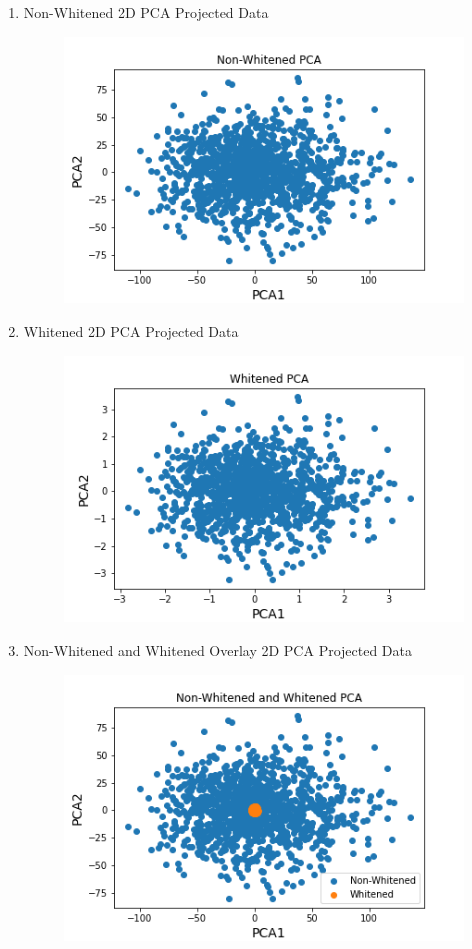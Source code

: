 \documentclass[12pt]{article}
\begin{document}
\begin{enumerate}
    \item Non-Whitened 2D PCA Projected Data
    \begin{figure}[H]
        \begin{center}
        \includegraphics{images/non-whitened_pca.png}
        \label{GD}
        \end{center}
    \end{figure}
    \item Whitened 2D PCA Projected Data
    \begin{figure}[H]
        \begin{center}
        \includegraphics{images/whitened_pca.png}
        \label{GD}
        \end{center}
    \end{figure}
    \item Non-Whitened and Whitened Overlay 2D PCA Projected Data
    \begin{figure}[H]
        \begin{center}
        \includegraphics{images/non-whitened_and_whitened_pca.png}

\end{center}
\end{figure}
\end{enumerate}
\end{document}
